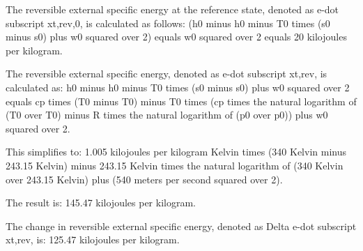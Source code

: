 The reversible external specific energy at the reference state, denoted as e-dot subscript xt,rev,0, is calculated as follows:
(h0 minus h0 minus T0 times (s0 minus s0) plus w0 squared over 2) equals w0 squared over 2 equals 20 kilojoules per kilogram.

The reversible external specific energy, denoted as e-dot subscript xt,rev, is calculated as:
h0 minus h0 minus T0 times (s0 minus s0) plus w0 squared over 2 equals cp times (T0 minus T0) minus T0 times (cp times the natural logarithm of (T0 over T0) minus R times the natural logarithm of (p0 over p0)) plus w0 squared over 2.

This simplifies to:
1.005 kilojoules per kilogram Kelvin times (340 Kelvin minus 243.15 Kelvin) minus 243.15 Kelvin times the natural logarithm of (340 Kelvin over 243.15 Kelvin) plus (540 meters per second squared over 2).

The result is:
145.47 kilojoules per kilogram.

The change in reversible external specific energy, denoted as Delta e-dot subscript xt,rev, is:
125.47 kilojoules per kilogram.